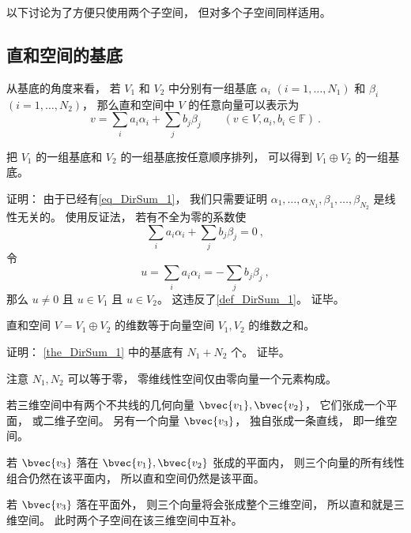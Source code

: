 以下讨论为了方便只使用两个子空间， 但对多个子空间同样适用。

\subsection{直和空间的基底}
从基底的角度来看， 若 $V_1$ 和 $V_2$ 中分别有一组基底 ${\alpha_i}$ $(i = 1, \dots, N_1)$ 和 ${\beta_i}$ $(i = 1, \dots, N_2)$， 那么直和空间中 $V$ 的任意向量可以表示为
\begin{equation}\label{eq_DirSum_1}
{v} = \sum_i a_i {\alpha_i} + \sum_j b_j {\beta_j} \qquad (v\in V, a_i, b_i \in \mathbb F)~.
\end{equation}
\begin{theorem}{}\label{the_DirSum_1}
把 $V_1$ 的一组基底和 $V_2$ 的一组基底按任意顺序排列， 可以得到 $V_1 \oplus V_2$ 的一组基底。
\end{theorem}

证明： 由于已经有\autoref{eq_DirSum_1}， 我们只需要证明 $\alpha_1, \dots, \alpha_{N_1}, \beta_1, \dots, \beta_{N_2}$ 是线性无关的。 使用反证法， 若有不全为零的系数使
\begin{equation}
\sum_i a_i {\alpha_i} + \sum_j b_j {\beta_j} = 0~,
\end{equation}
令
\begin{equation}
u = \sum_i a_i {\alpha_i} = -\sum_j b_j {\beta_j}~,
\end{equation}
那么 $u \ne 0$ 且 $u \in V_1$ 且 $u \in V_2$。 这违反了\autoref{def_DirSum_1}。 证毕。

\begin{corollary}{}\label{cor_DirSum_1}
直和空间 $V = V_1 \oplus V_2$ 的维数等于向量空间 $V_1, V_2$ 的维数之和。
\end{corollary}
证明： \autoref{the_DirSum_1} 中的基底有 $N_1 + N_2$ 个。 证毕。

注意 $N_1, N_2$ 可以等于零， 零维线性空间仅由零向量一个元素构成。

\begin{example}{}\label{ex_DirSum_1}
若三维空间中有两个不共线的几何向量 $\bvec{v_1}, \bvec{v_2}$， 它们张成一个平面， 或二维子空间。 另有一个向量 $\bvec{v_3}$， 独自张成一条直线， 即一维空间。

若 $\bvec{v_3}$ 落在 $\bvec{v_1}, \bvec{v_2}$ 张成的平面内， 则三个向量的所有线性组合仍然在该平面内， 所以直和空间仍然是该平面。

若 $\bvec{v_3}$ 落在平面外， 则三个向量将会张成整个三维空间， 所以直和就是三维空间。 此时两个子空间在该三维空间中互补。
\end{example}

